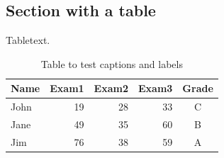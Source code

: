 \documentclass[a4paper]{article}
\begin{document}
\subsection{Section with a table}

Tabletext. 
\\
\begin{table}[h!]
\centering
\begin{tabular}{| l || r | r | r | c |}  
\hline
Name&Exam1&Exam2&Exam3&Grade\\
\hline\hline
John&19& 28&33&C \\  
\hline
Jane&49& 35&60&B  \\
\hline
Jim&76& 38&59&A  \\
\hline
\end{tabular}
\caption{Table to test captions and labels}
\label{table:data}
\end{table}
\end{document}
